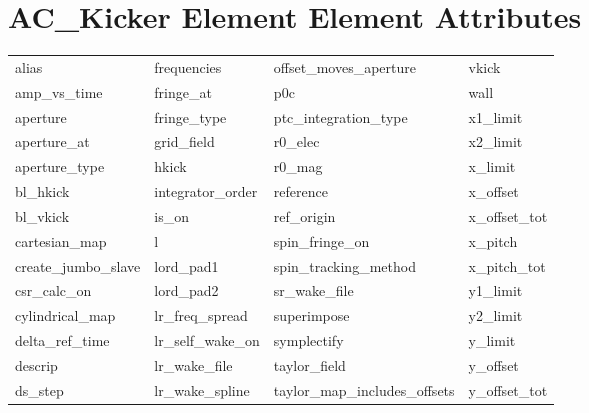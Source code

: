  \section{AC_Kicker Element Element Attributes}
 \label{s:list.ac.kicker}
 
 \begin{tabular}{llll} \toprule
alias                       & frequencies                 & offset_moves_aperture       & vkick                       \\
amp_vs_time                 & fringe_at                   & p0c                         & wall                        \\
aperture                    & fringe_type                 & ptc_integration_type        & x1_limit                    \\
aperture_at                 & grid_field                  & r0_elec                     & x2_limit                    \\
aperture_type               & hkick                       & r0_mag                      & x_limit                     \\
bl_hkick                    & integrator_order            & reference                   & x_offset                    \\
bl_vkick                    & is_on                       & ref_origin                  & x_offset_tot                \\
cartesian_map               & l                           & spin_fringe_on              & x_pitch                     \\
create_jumbo_slave          & lord_pad1                   & spin_tracking_method        & x_pitch_tot                 \\
csr_calc_on                 & lord_pad2                   & sr_wake_file                & y1_limit                    \\
cylindrical_map             & lr_freq_spread              & superimpose                 & y2_limit                    \\
delta_ref_time              & lr_self_wake_on             & symplectify                 & y_limit                     \\
descrip                     & lr_wake_file                & taylor_field                & y_offset                    \\
ds_step                     & lr_wake_spline              & taylor_map_includes_offsets & y_offset_tot                \\

\end{tabular}
